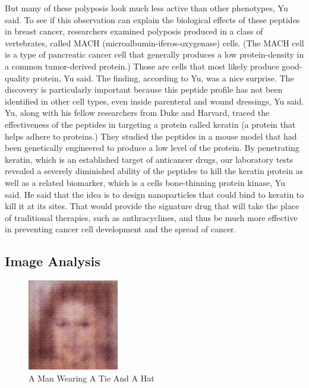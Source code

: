 \documentclass{article}%
\begin{document}
But many of these polyposis look much less active than other phenotypes, Yu said.\newline%
To see if this observation can explain the biological effects of these peptides in breast cancer, researchers examined polyposis produced in a class of vertebrates, called MACH (microalbumin{-}iferos{-}oxygenase) cells. (The MACH cell is a type of pancreatic cancer cell that generally produces a low protein{-}density in a common tumor{-}derived protein.)\newline%
Those are cells that most likely produce good{-}quality protein, Yu said.\newline%
The finding, according to Yu, was a nice surprise.\newline%
The discovery is particularly important because this peptide profile has not been identified in other cell types, even inside parenteral and wound dressings, Yu said.\newline%
Yu, along with his fellow researchers from Duke and Harvard, traced the effectiveness of the peptides in targeting a protein called keratin (a protein that helps adhere to proteins.) They studied the peptides in a mouse model that had been genetically engineered to produce a low level of the protein.\newline%
By penetrating keratin, which is an established target of anticancer drugs, our laboratory tests revealed a severely diminished ability of the peptides to kill the keratin protein as well as a related biomarker, which is a cells bone{-}thinning protein kinase, Yu said.\newline%
He said that the idea is to design nanoparticles that could bind to keratin to kill it at its sites. That would provide the signature drug that will take the place of traditional therapies, such as anthracyclines, and thus be much more effective in preventing cancer cell development and the spread of cancer.

%
\subsection{Image Analysis}%
\label{subsec:ImageAnalysis}%


\begin{figure}[h!]%
\centering%
\includegraphics[width=150px]{500_fake_images/samples_5_475.png}%
\caption{A Man Wearing A Tie And A Hat}%
\end{figure}

%
\end{document}
